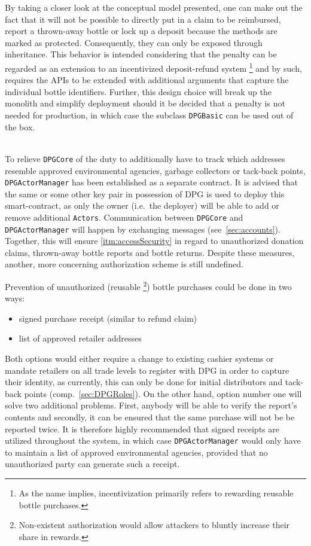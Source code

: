 \begin{description}[format={\storedescriptionlabel}]
	By taking a closer look at the conceptual model presented, one can make out the fact that it will not be possible to directly put in a claim to be reimbursed, report a thrown-away bottle or lock up a deposit because the methods are marked as protected. Consequently, they can only be exposed through inheritance. This behavior is intended considering that the penalty can be regarded as an extension to an incentivized deposit-refund system \footnote{As the name implies, incentivization primarily refers to rewarding reusable bottle purchases.} and by such, requires the APIs to be extended with additional arguments that capture the individual bottle identifiers. Further, this design choice will break up the monolith and simplify deployment should it be decided that a penalty is not needed for production, in which case the subclass \texttt{DPGBasic} can be used out of the box.
	\item[Access Control\label{itm:accessControl}]
	\hfill \\
	To relieve \texttt{DPGCore} of the duty to additionally have to track which addresses resemble approved environmental agencies, garbage collectors or tack-back points, \texttt{DPGActorManager} has been established as a separate contract. It is advised that the same or some other key pair in possession of \ac{DPG} is used to deploy this smart-contract, as only the owner (i.e.~the deployer) will be able to add or remove additional \texttt{Actors}. Communication between \texttt{DPGCore} and \texttt{DPGActorManager} will happen by exchanging messages (see~\ref{sec:accounts}). Together, this will ensure \ref{itm:accessSecurity} in regard to unauthorized donation claims, thrown-away bottle reports and bottle returns. Despite these measures, another, more concerning authorization scheme is still undefined. 
	
	Prevention of unauthorized (reusable \footnote{Non-existent authorization would allow attackers to bluntly increase their share in rewards.}) bottle purchases could be done in two ways:
	
	\begin{itemize}
  		\item signed purchase receipt (similar to refund claim)
  		\item list of approved retailer addresses
	\end{itemize}

	Both options would either require a change to existing cashier systems or mandate retailers on all trade levels to register with \ac{DPG} in order to capture their identity, as currently, this can only be done for initial distributors and tack-back points (comp.~\ref{sec:DPGRoles}). On the other hand, option number one will solve two additional problems. First, anybody will be able to verify the report's contents and secondly, it can be ensured that the same purchase will not be be reported twice. It is therefore highly recommended that signed receipts are utilized throughout the system, in which case \texttt{DPGActorManager} would only have to maintain a list of approved environmental agencies, provided that no unauthorized party can generate such a receipt.
	

\end{description}
